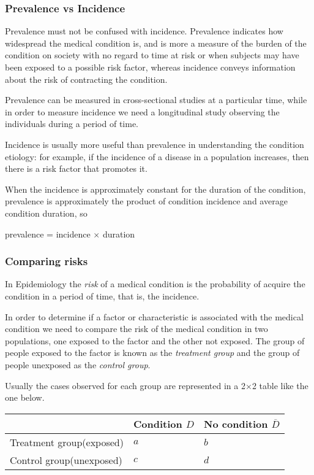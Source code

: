 \begin{frame}
\frametitle{Prevalence vs Incidence}
Prevalence must not be confused with incidence. Prevalence indicates how widespread the medical condition is, and is more a measure of the burden of the condition on society with no regard to time at risk or when subjects may have been exposed to a possible risk factor, whereas incidence conveys information about the risk of contracting the condition.

Prevalence can be measured in cross-sectional studies at a particular time, while in order to measure incidence we need a longitudinal study observing the individuals during a period of time.

Incidence is usually more useful than prevalence in understanding the condition etiology: for example, if the incidence of a disease in a population increases, then there is a risk factor that promotes it.

When the incidence is approximately constant for the duration of the condition, prevalence is approximately the product of condition incidence and average condition duration, so 
\begin{center}
  prevalence = incidence $\times$ duration
\end{center}
\end{frame}
  

\begin{frame}
\frametitle{Comparing risks}
In Epidemiology the \emph{risk} of a medical condition is the probability of acquire the condition in a period of time, that is, the incidence. 

In order to determine if a factor or characteristic is associated with the medical condition we need to compare the risk of the medical condition in two populations, one exposed to the factor and the other not exposed.
The group of people exposed to the factor is known as the \emph{treatment group} and the group of people unexposed as the \emph{control group}.

Usually the cases observed for each group are represented in a 2$\times$2 table like the one below. 

\begin{center}
  \begin{tabular}{|m{3cm}|m{3cm}<{\centering}|m{3cm}<{\centering}|}
  \cline{2-3}
  \multicolumn{1}{c|}{} & Condition $D$ & No condition $\overline D$\\ 
  \hline
  Treatment group\newline (exposed) & $a$ & $b$\\ 
  \hline 
  Control group\newline (unexposed) & $c$ & $d$\\ 
  \hline
  \end{tabular}
\end{center}
\end{frame}
  

